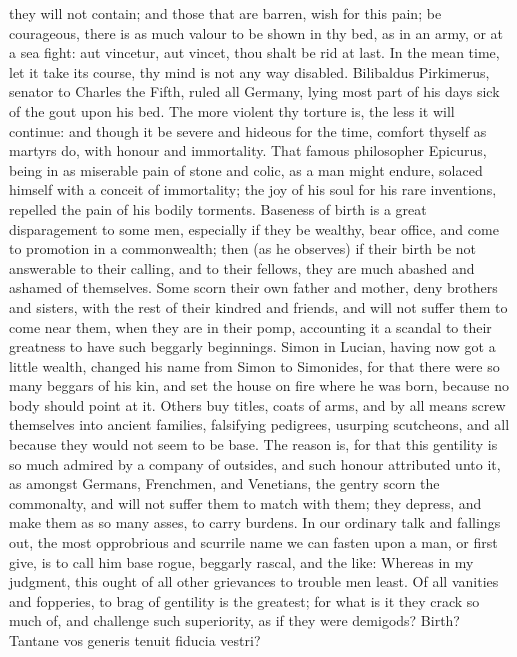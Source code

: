 {they will not contain; and those that are barren, wish for this pain;
be courageous, there is as much valour to be shown in thy bed, as
in an army, or at a sea fight: aut vincetur, aut vincet, thou shalt be
rid at last. In the mean time, let it take its course, thy mind is not
any way disabled. Bilibaldus Pirkimerus, senator to Charles the Fifth,
ruled all Germany, lying most part of his days sick of the gout upon
his bed. The more violent thy torture is, the less it will continue:
and though it be severe and hideous for the time, comfort thyself as
martyrs do, with honour and immortality. That famous philosopher
Epicurus, being in as miserable pain of stone and colic, as a man might
endure, solaced himself with a conceit of immortality; the joy of his
soul for his rare inventions, repelled the pain of his bodily torments.
Baseness of birth is a great disparagement to some men, especially if
they be wealthy, bear office, and come to promotion in a commonwealth;
then (as he observes) if their birth be not answerable to their
calling, and to their fellows, they are much abashed and ashamed of
themselves. Some scorn their own father and mother, deny brothers and
sisters, with the rest of their kindred and friends, and will not
suffer them to come near them, when they are in their pomp, accounting
it a scandal to their greatness to have such beggarly beginnings. Simon
in Lucian, having now got a little wealth, changed his name from Simon
to Simonides, for that there were so many beggars of his kin, and set
the house on fire where he was born, because no body should point at
it. Others buy titles, coats of arms, and by all means screw themselves
into ancient families, falsifying pedigrees, usurping scutcheons, and
all because they would not seem to be base. The reason is, for that
this gentility is so much admired by a company of outsides, and such
honour attributed unto it, as amongst Germans, Frenchmen, and
Venetians, the gentry scorn the commonalty, and will not suffer them to
match with them; they depress, and make them as so many asses, to carry
burdens. In our ordinary talk and fallings out, the most opprobrious
and scurrile name we can fasten upon a man, or first give, is to call
him base rogue, beggarly rascal, and the like: Whereas in my judgment,
this ought of all other grievances to trouble men least. Of all
vanities and fopperies, to brag of gentility is the greatest; for what
is it they crack so much of, and challenge such superiority, as if they
were demigods? Birth? Tantane vos generis tenuit fiducia vestri?
}
